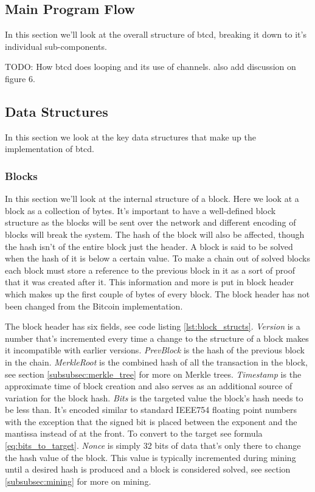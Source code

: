 \documentclass[12pt]{article}
\begin{document}
\subsection{Main Program Flow}
In this section we'll look at the overall structure of btcd, breaking it down to it's individual sub-components. 


TODO: How btcd does looping and its use of channels. also add discussion on figure 6.


\subsection{Data Structures}
In this section we look at the key data structures that make up the implementation of btcd. 

\subsubsection{Blocks}
In this section we'll look at the internal structure of a block. Here we look at a block as a collection of bytes. It's important to have a well-defined block structure as the blocks will be sent over the network and different encoding of blocks will break the system. The hash of the block will also be affected, though the hash isn't of the entire block just the header.
A block is said to be solved when the hash of it is below a certain value. To make a chain out of solved blocks each block must store a reference to the previous block in it as a sort of proof that it was created after it. This information and more is put in block header which makes up the first couple of bytes of every block. The block header has not been changed from the Bitcoin implementation. 

The block header has six fields, see code listing \ref{lst:block_structs}. \emph{Version} is a number that's incremented every time a change to the structure of a block makes it incompatible with earlier versions. \emph{PrevBlock} is the hash of the previous block in the chain. \emph{MerkleRoot} is the combined hash of all the transaction in the block, see section \ref{subsubsec:merkle_tree} for more on Merkle trees. \emph{Timestamp} is the approximate time of block creation and also serves as an additional source of variation for the block hash. \emph{Bits} is the targeted value the block's hash needs to be less than. It's encoded similar to standard IEEE754 floating point numbers with the exception that the signed bit is placed between the exponent and the mantissa instead of at the front. To convert to the target see formula \ref{eq:bits_to_target}. \emph{Nonce} is simply 32 bits of data that's only there to change the hash value of the block. This value is typically incremented during mining until a desired hash is produced and a block is considered solved, see section \ref{subsubsec:mining} for more on mining.
\end{document}
